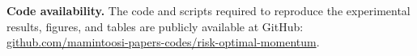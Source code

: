 \documentclass[a4paper,fleqn]{cas-dc}
\theoremstyle{plain}
\theoremstyle{definition}
\theoremstyle{remark}
\begin{document}
\textbf{Code availability.} The code and scripts required to reproduce the experimental results, figures, and tables are publicly available at GitHub: \href{https://github.com/mamintoosi-papers-codes/risk-optimal-momentum}{github.com/mamintoosi-papers-codes/risk-optimal-momentum}.

\end{document}
